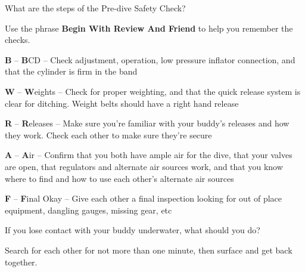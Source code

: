 	\begin{qanda}
		\begin{question}
What are the steps of the Pre-dive Safety Check?
		\end{question}

		\begin{answer}
Use the phrase \textbf{Begin With Review And Friend} to help you remember the checks.
			\begin{nospacenumberedlist}
				\item \textbf{B} -- \textbf{B}CD -- Check adjustment, operation, low pressure inflator connection, and that the cylinder is firm in the band
				\item \textbf{W} -- \textbf{W}eights -- Check for proper weighting, and that the quick release system is clear for ditching.  Weight belts should have a right hand release
				\item \textbf{R} -- \textbf{R}eleases -- Make sure you're familiar with your buddy's releases and how they work.  Check each other to make sure they're secure
				\item \textbf{A} -- \textbf{A}ir -- Confirm that you both have ample air for the dive, that your valves are open, that regulators and alternate air sources work, and that you know where to find and how to use each other's alternate air sources
				\item \textbf{F} -- \textbf{F}inal Okay -- Give each other a final inspection looking for out of place equipment, dangling gauges, missing gear, etc
			\end{nospacenumberedlist}
		\end{answer}
	\end{qanda}

	\begin{qanda}
		\begin{question}
If you lose contact with your buddy underwater, what should you do?
		\end{question}

		\begin{answer}
Search for each other for not more than one minute, then surface and get back together.
		\end{answer}
	\end{qanda} 